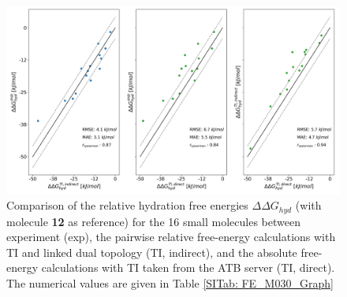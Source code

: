 \begin{figure}[h!]
    \centering
    \includegraphics[width=\textwidth]{fig/results/pairwise/FE/M030_graph_ddG_solv_correlation_ATB_TI.png}
    \caption{Comparison of the relative hydration free energies $\Delta \Delta G_{hyd}$ (with molecule \textbf{12} as reference) for the 16 small molecules between experiment (exp), the pairwise relative free-energy calculations with TI and linked dual topology (TI, indirect), and the absolute free-energy calculations with TI taken from the ATB server\cite{Stroet2018} (TI, direct). The numerical values are given in Table \ref{SITab: FE_M030_Graph}} 
    \label{fig: pairCorr}
\end{figure}


